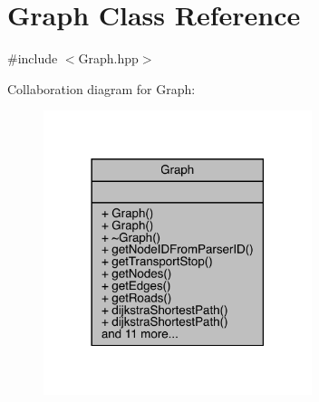 \hypertarget{class_graph}{}\section{Graph Class Reference}
\label{class_graph}


{\ttfamily \#include $<$Graph.\+hpp$>$}



Collaboration diagram for Graph\+:\nopagebreak
\begin{figure}[H]
\begin{center}
\leavevmode
\includegraphics[width=222pt]{class_graph__coll__graph}
\end{center}
\end{figure}
